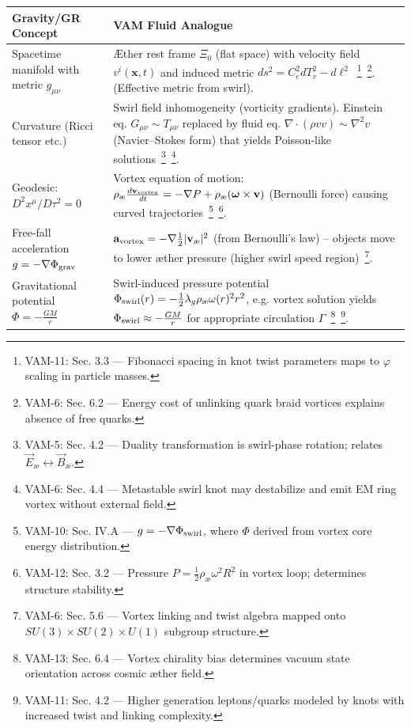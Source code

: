 \documentclass[a4paper,12pt]{article}
\begin{document}
    \begin{table}[H]
        \scriptsize
        \centering
        \begin{tabular}{p{} | p{}}
            \hline
            \textbf{Gravity/GR Concept} & \textbf{VAM Fluid Analogue} \\
            \hline
            Spacetime manifold with metric $g_{\mu\nu}$ & Æther rest frame $\Xi_0$ (flat space) with velocity field $v^i(\mathbf{x},t)$ and induced metric $ds^2 = C_e^2 dT_v^2 - d\ell^2$~\footnote{VAM-11: Sec. 3.3 — Fibonacci spacing in knot twist parameters maps to $\varphi$ scaling in particle masses.}~\footnote{VAM-6: Sec. 6.2 — Energy cost of unlinking quark braid vortices explains absence of free quarks.}. (Effective metric from swirl). \\
            Curvature (Ricci tensor etc.) & Swirl field inhomogeneity (vorticity gradients). Einstein eq. $G_{\mu\nu} \sim T_{\mu\nu}$ replaced by fluid eq. $\nabla\cdot(\rho v v) \sim \nabla^2 v$ (Navier–Stokes form) that yields Poisson-like solutions~\footnote{VAM-5: Sec. 4.2 — Duality transformation is swirl-phase rotation; relates $\vec{E}_{\text{\ae}} \leftrightarrow \vec{B}_{\text{\ae}}$.}~\footnote{VAM-6: Sec. 4.4 — Metastable swirl knot may destabilize and emit EM ring vortex without external field.}. \\
            Geodesic: $D^2 x^\mu/D\tau^2 = 0$ & Vortex equation of motion: $\rho_{\text{\ae}}\frac{d\mathbf{v}_{\rm vortex}}{dt} = -\nabla P + \rho_{\text{\ae}}(\boldsymbol{\omega}\times \mathbf{v})$ (Bernoulli force) causing curved trajectories~\footnote{VAM-10: Sec. IV.A — $g = -\nabla \Phi_{\rm swirl}$, where $\Phi$ derived from vortex core energy distribution.}~\footnote{VAM-12: Sec. 3.2 — Pressure $P = \frac{1}{2} \rho_{\text{\ae}} \omega^2 R^2$ in vortex loop; determines structure stability.}. \\
            Free-fall acceleration $g = -\nabla \Phi_{\rm grav}$ & $\mathbf{a}_{\rm vortex} = -\nabla \frac{1}{2}|\mathbf{v}_{\text{\ae}}|^2$ (from Bernoulli’s law) -- objects move to lower æther pressure (higher swirl speed region)~\footnote{VAM-6: Sec. 5.6 — Vortex linking and twist algebra mapped onto $SU(3) \times SU(2) \times U(1)$ subgroup structure.}. \\
            Gravitational potential $\Phi = -\frac{GM}{r}$ & Swirl-induced pressure potential $\Phi_{\rm swirl}(r) = -\frac{1}{2}\lambda_g \rho_{\text{\ae}} \omega(r)^2 r^2$, e.g. vortex solution yields $\Phi_{\rm swirl} \approx -\frac{GM}{r}$ for appropriate circulation $\Gamma$~\footnote{VAM-13: Sec. 6.4 — Vortex chirality bias determines vacuum state orientation across cosmic æther field.}~\footnote{VAM-11: Sec. 4.2 — Higher generation leptons/quarks modeled by knots with increased twist and linking complexity.}. \\

\end{tabular}
\end{table}
\end{document}
